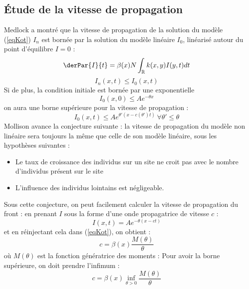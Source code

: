\documentclass{article}
\begin{document}
\subsection{Étude de la vitesse de propagation}
Medlock \cite{KotMedlock03} a montré que la vitesse de propagation de la solution du modèle (\ref{eqKot}) $I_n$ est bornée par la solution du modèle linéaire $I_0$, linéarisé autour du point d'équilibre $I=0$ :
\begin{equation}\label{modLin}
\derPar{I}{t}=\beta(x)N\int_{\mathbb{R}}k(x,y)I(y,t) dt
\end{equation}
\[I_n(x,t)\leq I_0(x,t)\]
Si de plus, la condition initiale est bornée par une exponentielle \[I_0(x,0)\leq Ae^{-\theta x}\] on aura une borne supérieure pour la vitesse de propagation :
\begin{equation}\label{bornSup}
	I_0(x,t)\leq Ae^{\theta'(x-c(\theta')t)}\ \forall \theta'\leq \theta
\end{equation}
Mollison \cite{mollison1991dependence} avance la conjecture suivante : la vitesse de propagation du modèle non linéaire sera toujours la même que celle de son modèle linéaire, sous les hypothèses suivantes :
\begin{itemize}
	\item Le taux de croissance des individus sur un site ne croit pas avec le nombre d'individus présent sur le site
	\item L'influence des individus lointains est négligeable.
\end{itemize}
Sous cette conjecture, on peut facilement calculer la vitesse de propagation du front : en prenant $I$ sous la forme d'une onde propagatrice de vitesse $c$ :
	\[I(x,t)=Ae^{-\theta(x-ct)}\]
et en réinjectant cela dans (\ref{eqKot}), on obtient :
	\[c=\beta(x)\frac{M(\theta)}{\theta}\]
où $M(\theta)$ est la fonction génératrice des moments :
Pour avoir la borne supérieure, on doit prendre l'infimum :
\begin{equation}\label{bornVit}
	c=\beta(x)\inf_{\theta>0}\frac{M(\theta)}{\theta}
\end{equation}
\end{document}
